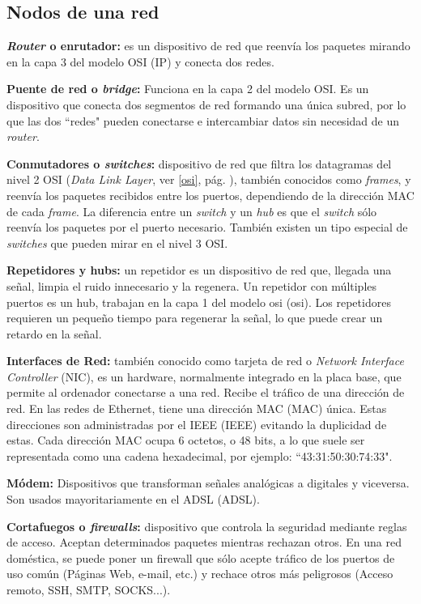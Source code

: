 \documentclass[a4paper, 11pt]{report} %
\newcommand{\acr}[1]{\acrshort{#1} (\acrlong{#1})}
\begin{document}
\subsection{Nodos de una red}
\begin{description}
\item \textbf{\textit{Router} o enrutador:} es un dispositivo de red que reenvía los paquetes mirando en la capa 3 del modelo OSI (IP) y conecta dos redes.
\item \textbf{Puente de red o \textit{bridge}:} Funciona en la capa 2 del modelo OSI. Es un dispositivo que conecta dos segmentos de red formando una única subred, por lo que las dos ``redes" pueden conectarse e intercambiar datos sin necesidad de un \textit{router}.
\item \textbf{Conmutadores o \textit{switches}:} dispositivo de red que filtra los datagramas del nivel 2 OSI (\textit{Data Link Layer}, ver \ref{osi}, pág. \pageref{osi}), también conocidos como \textit{frames}, y reenvía los paquetes recibidos entre los puertos, dependiendo de la dirección MAC de cada \textit{frame}. La diferencia entre un \textit{switch} y un \textit{hub} es que el \textit{switch} sólo reenvía los paquetes por el puerto necesario. También existen un tipo especial de \textit{switches} que pueden mirar en el nivel 3 OSI.
\item \textbf{Repetidores y hubs:} un repetidor es un dispositivo de red que, llegada una señal, limpia el ruido innecesario y la regenera. Un repetidor con múltiples puertos es un hub, trabajan en la capa 1 del modelo \acr{osi}. Los repetidores requieren un pequeño tiempo para regenerar la señal, lo que puede crear un retardo en la señal.
\item \textbf{Interfaces de Red:} también conocido como tarjeta de red o \textit{Network Interface Controller} (NIC), es un \gls{hardware}, normalmente integrado en la placa base, que permite al ordenador conectarse a una red. Recibe el tráfico de una dirección de red. En las redes de Ethernet, tiene una dirección \acr{MAC} única. Estas direcciones son administradas por el \acr{IEEE} evitando la duplicidad de estas. Cada dirección MAC ocupa 6 octetos, o 48 bits, a lo que suele ser representada como una cadena hexadecimal, por ejemplo: ``43:31:50:30:74:33".
\item \textbf{Módem:} Dispositivos que transforman señales analógicas a digitales y viceversa. Son usados mayoritariamente en el \acr{ADSL}.
\item \textbf{Cortafuegos o \textit{firewalls}:} dispositivo que controla la seguridad mediante reglas de acceso. Aceptan determinados paquetes mientras rechazan otros. En una red doméstica, se puede poner un firewall que sólo acepte tráfico de los puertos de uso común (Páginas Web, e-mail, etc.) y rechace otros más peligrosos (Acceso remoto, SSH, SMTP, SOCKS...).
\end{description}
\end{document}
